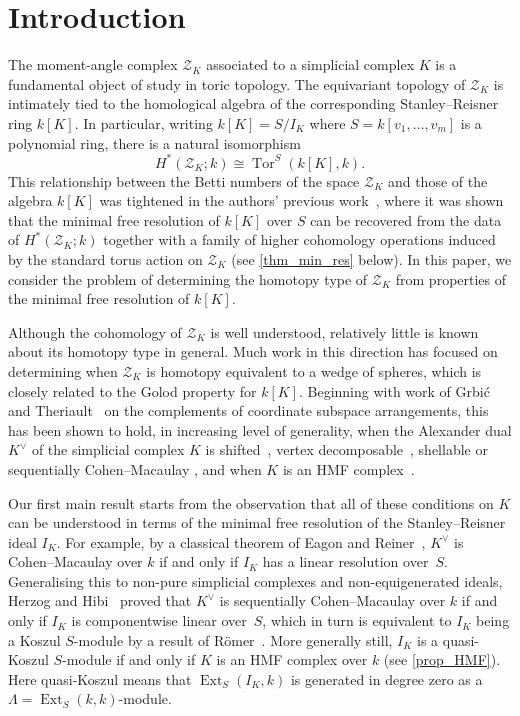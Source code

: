 \documentclass[a4paper,10pt]{amsart}
\theoremstyle{definition}
\theoremstyle{remark}
\DeclareMathOperator{\Ext}{Ext}
\DeclareMathOperator{\Tor}{Tor}
\begin{document}
\setcounter{tocdepth}{1}
\tableofcontents


\section{Introduction}

The {moment-angle complex} $\mathcal{Z}_K$ associated to a simplicial complex $K$ is a fundamental object of study in toric topology. The equivariant topology of $\mathcal{Z}_K$ is intimately tied to the homological algebra of the corresponding Stanley--Reisner ring $k[K]$. In particular, writing $k[K]=S/I_K$ where $S=k[v_1,\ldots,v_m]$ is a polynomial ring, there is a natural isomorphism
\[
H^*(\mathcal{Z}_K;k)\cong \Tor^S(k[K],k).
\]
This relationship between the Betti numbers of the space $\mathcal{Z}_K$ and those of the algebra $k[K]$ was tightened in the authors' previous work~\cite{AB}, where it was shown that the minimal free resolution of $k[K]$ over $S$ can be recovered from the data of $H^*(\mathcal{Z}_K;k)$ together with a family of higher cohomology operations induced by the standard torus action on $\mathcal{Z}_K$ (see \cref{thm_min_res} below). In this paper, we consider the problem of determining the homotopy type of $\mathcal{Z}_K$ from properties of the minimal free resolution of $k[K]$.

Although the cohomology of $\mathcal{Z}_K$ is well understood, relatively little is known about its homotopy type in general. Much work in this direction has focused on determining when $\mathcal{Z}_K$ is homotopy equivalent to a wedge of spheres, which is closely related to the Golod property for $k[K]$. Beginning with work of Grbi\'c and Theriault~\cite{GT04} on the complements of coordinate subspace arrangements, this has been shown to hold, in increasing level of generality, when the Alexander dual $K^\vee$ of the simplicial complex $K$ is shifted~\cite{GT07,GT13,IK13}, vertex decomposable~\cite{GW}, shellable or sequentially Cohen--Macaulay %
\cite{IK19}, and when $K$ is an HMF complex~\cite{BG}.

Our first main result starts from the observation that all of these conditions on $K$ can be understood in terms of the minimal free resolution of the Stanley--Reisner ideal $I_K$. For example, by a classical theorem of Eagon and Reiner~\cite{ER}, $K^\vee$ is Cohen--Macaulay over $k$ if and only if $I_K$ has a linear resolution over~$S$. Generalising this to non-pure simplicial complexes and non-equigenerated ideals, Herzog and Hibi~\cite{HH} proved that $K^\vee$ is sequentially Cohen--Macaulay over $k$ if and only if $I_K$ is componentwise linear over~$S$, which in turn
is equivalent to $I_K$ being a Koszul $S$-module by a result of R\"omer~\cite{R}. More generally still, $I_K$ is a quasi-Koszul $S$-module if and only if $K$ is an HMF complex over $k$ (see \cref{prop_HMF}). Here quasi-Koszul means that $\Ext_S(I_K,k)$ is generated in degree zero as a $\Lambda=\Ext_S(k,k)$-module.
\end{document}
